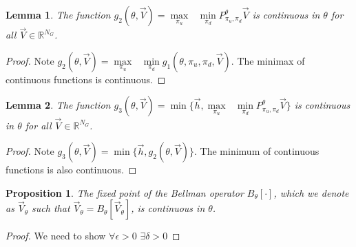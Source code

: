 \documentclass{journal}
\newcommand{\RR}{\mathbb{R}}
\newtheorem{lemma}{Lemma}
\newtheorem{proposition}{Proposition}
\begin{document}
\begin{lemma}
The function $g_2(\theta,\vec{V})= \underset{\pi_u}{\max}\text{ }\underset{ \pi_d}{\min} P^{\theta}_{\pi_u, \pi_d} \vec{V}$ is continuous in $\theta$ for all $\vec{V}\in \RR^{N_G}$.
\end{lemma}

\begin{proof}
Note $g_2(\theta,\vec{V})=\underset{\pi_u}{\max}\text{ }\underset{ \pi_d}{\min}g_1(\theta,\pi_u,\pi_d,\vec{V})$. The minimax of continuous functions is continuous. 
\end{proof}


\begin{lemma}
The function $g_3(\theta,\vec{V})= \min\{\vec{h}, \underset{\pi_u}{\max}\text{ }\underset{ \pi_d}{\min} P^{\theta}_{\pi_u, \pi_d} \vec{V}\}$ is continuous in $\theta$ for all $\vec{V}\in \RR^{N_G}$.
\end{lemma}

\begin{proof}
Note $g_3(\theta,\vec{V})= \min\{\vec{h}, g_2(\theta,\vec{V})\}$. The minimum of continuous functions is also continuous. 
\end{proof}

\begin{proposition}
The fixed point of the Bellman operator $B_{\theta}[\cdot]$, which we denote as $\vec{V}_{\theta}$ such that $\vec{V}_{\theta}=B_{\theta}[\vec{V}_{\theta}]$, is continuous in $\theta$.
\end{proposition}

\begin{proof}
We need to show $\forall \epsilon>0$ $\exists \delta>0$
\end{proof}
\end{document}
